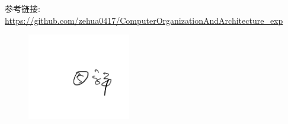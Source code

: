 \documentclass[AutoFakeBold]{LZUThesis}
\begin{document}

\backmatter





\Appendix
参考链接:
\url{https://github.com/zehua0417/ComputerOrganizationAndArchitecture_exp}
\begin{figure}[htbp]
    \centering
    \includegraphics[width=0.4\textwidth]{img/sign}
\end{figure}



\end{document}
